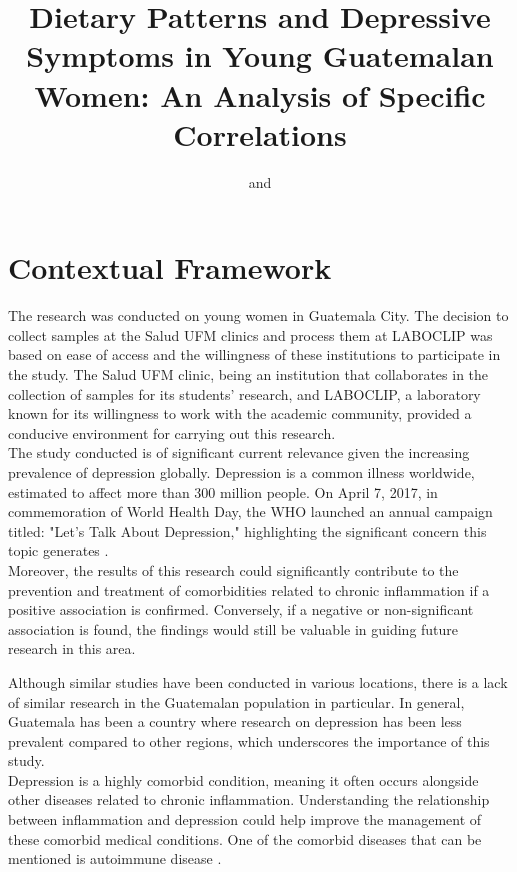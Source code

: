 \documentclass[jou]{apa7}
\title{Dietary Patterns and Depressive Symptoms in Young Guatemalan Women: An Analysis of Specific Correlations}
\author{
	\addORCIDlink{Camila Heredia, M.D.}{0009-0008-9550-9083} and \addORCIDlink{Lic. María Andrée Neumann}{0009-0001-2531-6058}
}
\affiliation{Graduate School, Universidad Francisco Marroquín}
\begin{document}
	\maketitle



	\section{Contextual Framework}\label{marco-contextual}

	The research was conducted on young women in Guatemala City. The decision to collect samples at the Salud UFM clinics and process them at LABOCLIP was based on ease of access and the willingness of these institutions to participate in the study. The Salud UFM clinic, being an institution that collaborates in the collection of samples for its students' research, and LABOCLIP, a laboratory known for its willingness to work with the academic community, provided a conducive environment for carrying out this research.\\

	The study conducted is of significant current relevance given the increasing prevalence of depression globally. Depression is a common illness worldwide, estimated to affect more than 300 million people. On April 7, 2017, in commemoration of World Health Day, the WHO launched an annual campaign titled: "Let's Talk About Depression," highlighting the significant concern this topic generates \parencite{Toshi2022}.\\

	Moreover, the results of this research could significantly contribute to the prevention and treatment of comorbidities related to chronic inflammation if a positive association is confirmed. Conversely, if a negative or non-significant association is found, the findings would still be valuable in guiding future research in this area.

	Although similar studies have been conducted in various locations, there is a lack of similar research in the Guatemalan population in particular. In general, Guatemala has been a country where research on depression has been less prevalent compared to other regions, which underscores the importance of this study.\\

	Depression is a highly comorbid condition, meaning it often occurs alongside other diseases related to chronic inflammation. Understanding the relationship between inflammation and depression could help improve the management of these comorbid medical conditions. One of the comorbid diseases that can be mentioned is autoimmune disease \parencite{Bloch1983}.
\end{document}
